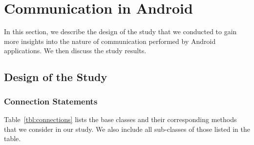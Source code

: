 


\vspace{-0.05in}
\section{Communication in Android}
\label{sec:study} 

In this section, we describe the design of the study that we conducted to gain more insights into the nature of communication performed by Android applications. We then discuss the study results. 

\vspace{-0.05in}
\subsection{Design of the Study}

\subsubsection{Connection Statements}
Table~\ref{tbl:connections} lists the base classes and their corresponding methods that we consider in our study. 
We also include all sub-classes of those listed in the table.

